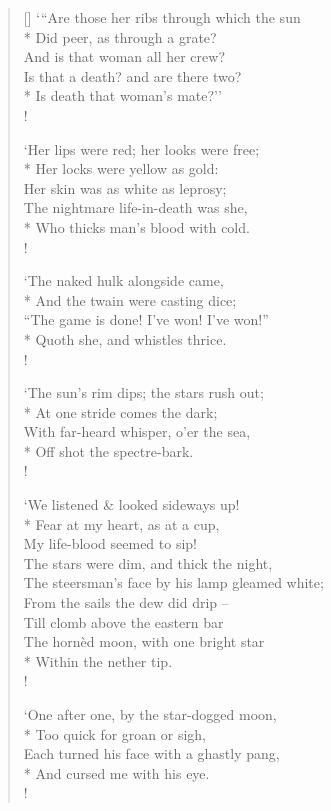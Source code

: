\documentclass[MAIN]{subfiles}
\begin{document}
\begin{verse}[\versewidth]
`{``}Are those her ribs through which the sun\\*
\vin Did peer, as through a grate?\\
And is that woman all her crew?\\
Is that a death? and are there two?\\*
\vin Is death that woman's mate?''\\!

`Her lips were red; her looks were free;\\*
\vin Her locks were yellow as gold:\\
Her skin was as white as leprosy;\\
The nightmare life-in-death was she,\\* 
\vin Who thicks man's blood with cold.\\!

`The naked hulk alongside came,\\*
\vin And the twain were casting dice;\\
``The game is done! I've won! I've won!''\\*
\vin Quoth she, and whistles thrice.\\!

`The sun's rim dips; the stars rush out;\\*
\vin At one stride comes the dark;\\
With far-heard whisper, o'er the sea,\\*
\vin Off shot the spectre-bark.\\!

`We listened \& looked sideways up!\\*
Fear at my heart, as at a cup,\\
\vin My life-blood seemed to sip!\\
The stars were dim, and thick the night,\\
The steersman's face by his lamp gleamed white;\\
\vin From the sails the dew did drip --\\
Till clomb above the eastern bar\\
The horn\`ed moon, with one bright star\\*
\vin Within the nether tip.\\!

`One after one, by the star-dogged moon,\\*
\vin Too quick for groan or sigh,\\
Each turned his face with a ghastly pang,\\*
\vin And cursed me with his eye.\\!


\end{verse}
\end{document}
